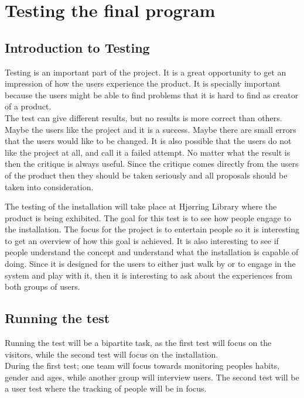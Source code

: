 \chapter{Testing the final program}
\section{Introduction to Testing}
Testing is an important part of the project. It is a great opportunity to get an impression of how the users experience the product. It is specially important because the users might be able to find problems that it is hard to find as creator of a product. \\
The test can give different results, but no results is more correct than others. Maybe the users like the project and it is a success. Maybe there are small errors that the users would like to be changed. It is also possible that the users do not like the project at all, and call it a failed attempt. No matter what the result is then the critique is always useful. Since the critique comes directly from the users of the product then they should be taken seriously and all proposals should be taken into consideration. 

The testing of the installation will take place at Hj{\o}rring Library where the product is being exhibited. The goal for this test is to see how people engage to the installation. The focus for the project is to entertain people so it is interesting to get an overview of how this goal is achieved. It is also interesting to see if people understand the concept and understand what the installation is capable of doing. Since it is designed for the users to either just walk by or to engage in the system and play with it, then it is interesting to ask about the experiences from both groups of users. \\ 

\section{Running the test}
Running the test will be a bipartite task, as the first test will focus on the visitors, while the second test will focus on the installation.\\
During the first test; one team will focus towards monitoring peoples habits, gender and ages, while another group will interview users. The second test will be a user test where the tracking of people will be in focus.

